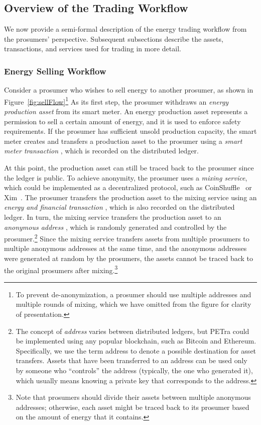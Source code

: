 \subsection{Overview of the Trading Workflow}
We now provide a semi-formal description of the energy trading
workflow from the prosumers' perspective.  Subsequent subsections
describe the assets, transactions, and services used for trading in
more detail.

\subsubsection{Energy Selling Workflow}
Consider a prosumer who wishes to sell energy to another prosumer, as
shown in Figure~\ref{fig:sellFlow}\footnote{To prevent
  de-anonymization, a prosumer should use multiple addresses and
  multiple rounds of mixing, which we have omitted from the figure for
  clarity of presentation.}    As
its first step, the prosumer withdraws an \emph{energy production
  asset} from its smart meter.  An energy production asset represents
a permission to sell a certain amount of energy, and it is used to
enforce safety requirements.  If the prosumer has sufficient unsold
production capacity, the smart meter creates and transfers a
production asset to the prosumer using a \emph{smart meter
  transaction} , which is recorded on the distributed
ledger.

At this point, the production asset can still be traced back to the
prosumer since the ledger is public.  To achieve anonymity, the
prosumer uses a \emph{mixing service}, which could be implemented as a
decentralized protocol, such as
CoinShuffle~\cite{ruffing2014coinshuffle} or
Xim~\cite{bissias2014sybil}.  The prosumer transfers the production
asset to the mixing service using an \emph{energy and financial
  transaction} , which is also recorded on the distributed
ledger.  In turn, the mixing service transfers the production asset to
an \emph{anonymous address} , which is randomly generated
and controlled by the prosumer.\footnote{The concept of \emph{address}
  varies between distributed ledgers, but PETra could be implemented
  using any popular blockchain, such as Bitcoin and Ethereum.
  Specifically, we use the term address to denote a possible
  destination for asset transfers.  Assets that have been transferred
  to an address can be used only by someone who ``controls'' the
  address (typically, the one who generated it), which usually means
  knowing a private key that corresponds to the address.}  Since the
mixing service transfers assets from multiple prosumers to multiple
anonymous addresses at the same time, and the anonymous addresses were
generated at random by the prosumers, the assets cannot be traced back
to the original prosumers after mixing.\footnote{Note that prosumers
  should divide their assets between multiple anonymous addresses;
  otherwise, each asset might be traced back to its prosumer based on
  the amount of energy that it contains.}

